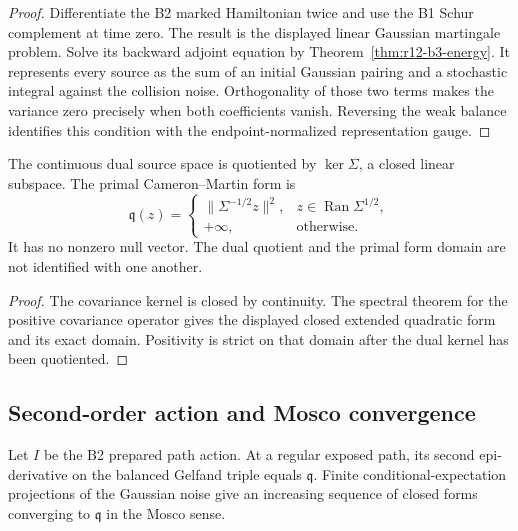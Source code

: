 \begin{proof}
Differentiate the B2 marked Hamiltonian twice and use the B1 Schur complement
at time zero.  The result is the displayed linear Gaussian martingale
problem.  Solve its backward adjoint equation by
Theorem~\ref{thm:r12-b3-energy}.  It represents every source as the sum of an
initial Gaussian pairing and a stochastic integral against the collision
noise.  Orthogonality of those two terms makes the variance zero precisely
when both coefficients vanish.  Reversing the weak balance identifies this
condition with the endpoint-normalized representation gauge.
\end{proof}

\begin{proposition}
\label{prop:r12-b3-typed}
The continuous dual source space is quotiented by $\ker\Sigma$, a closed
linear subspace.  The primal Cameron--Martin form is
\[
 \mathfrak q(z)=
 \begin{cases}
  \|\Sigma^{-1/2}z\|^2,&z\in\operatorname{Ran}\Sigma^{1/2},\\
  +\infty,&\text{otherwise}.
 \end{cases}
\]
It has no nonzero null vector.  The dual quotient and the primal form domain
are not identified with one another.
\end{proposition}

\begin{proof}
The covariance kernel is closed by continuity.  The spectral theorem for the
positive covariance operator gives the displayed closed extended quadratic
form and its exact domain.  Positivity is strict on that domain after the dual
kernel has been quotiented.
\end{proof}

\subsection{Second-order action and Mosco convergence}

\begin{theorem}
\label{thm:r12-b3-mosco}
Let $I$ be the B2 prepared path action.  At a regular exposed path, its second
epi-derivative on the balanced Gelfand triple equals $\mathfrak q$.  Finite
conditional-expectation projections of the Gaussian noise give an increasing
sequence of closed forms converging to $\mathfrak q$ in the Mosco sense.
\end{theorem}

